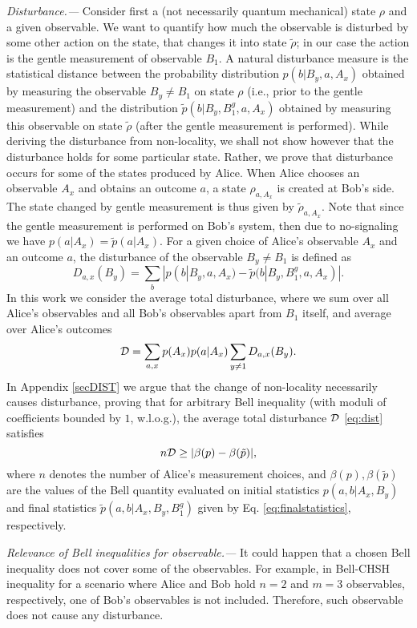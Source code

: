 \documentclass[pra,twocolumn,showpacs,preprintnumbers,amsmath,amssymb,superscriptaddress]{revtex4-1}
\def\be{\begin{equation}}
\def\ee{\end{equation}}
\def\omeas{B_1}
\def\ogentle{B_1^g}
\def\dist{{\cal D}}
\begin{document}
\textit{Disturbance.---}
Consider first a (not necessarily quantum mechanical) state $\rho$ and a given observable. We want to quantify how much the observable  is disturbed by some other action on the state, that changes it into state $\tilde\rho$; in our case the action is the
gentle measurement of observable $\omeas$. A natural disturbance measure is the statistical distance between the probability distribution $p(b|B_y,a,A_x)$ obtained by measuring the observable $B_y \neq \omeas$
on state $\rho$ (i.e., prior to the gentle measurement) and the distribution $\tilde p(b|B_y,\ogentle,a,A_x)$ obtained by measuring this observable on state $\tilde\rho$ (after the gentle measurement is performed).
While deriving the disturbance from non-locality, we shall not show however that the disturbance holds for some particular state. 
Rather, we prove that disturbance occurs for some of the states produced by Alice.
When Alice chooses an observable $A_x$ and obtains an outcome $a$, a state $\rho_{a,A_x}$ is created at Bob's side. The state changed by gentle measurement is thus given by $\tilde \rho_{a,A_x}$.
Note that
since the gentle measurement is performed on Bob's system, then due to no-signaling we have $p(a|A_x)=\tilde p(a|A_x)$.
For a given choice of Alice's observable $A_x$ and an outcome $a$, the disturbance of the observable $B_y \neq \omeas$ is defined as
\be
D_{a,x}(B_y)= \sum_b |p(b|B_y,a,A_x) - \tilde p(b|B_y,\ogentle,a,A_x)|.
\ee
In this work we consider the average total disturbance, where we sum over all Alice's observables and all Bob's observables apart from $\omeas$ itself, and average over Alice's outcomes
\be
\dist= \sum_{a,x} p(A_x) p(a|A_x) \sum_{y\not = 1}  D_{a,x}(B_y).
\label{eq:dist}
\ee
In Appendix \ref{secDIST} we argue that the change of non-locality necessarily causes disturbance, proving that
for arbitrary Bell inequality (with moduli of coefficients bounded by $1$, w.l.o.g.), the average total disturbance $\dist$ \eqref{eq:dist} satisfies
\be
\label{eq:DB}
n \dist \geq |\beta(p)- \beta(\tilde p)|,
\ee
where $n$ denotes the number of Alice's measurement choices, and $\beta(p), \beta(\tilde p)$ are the values of the Bell quantity evaluated on initial statistics $p(a,b|A_x,B_y)$ and final statistics $\tilde p(a,b|A_x,B_y,\ogentle)$ given by Eq. \eqref{eq:finalstatistics}, respectively.

\textit{Relevance of Bell inequalities for observable.---}
It could happen that a chosen Bell inequality does not cover some of the observables.
For example, in Bell-CHSH inequality for a scenario where Alice and Bob hold $n=2$ and $m=3$ observables, respectively, one of Bob's observables is not included. 
Therefore, such observable does not cause any disturbance.
\end{document}
